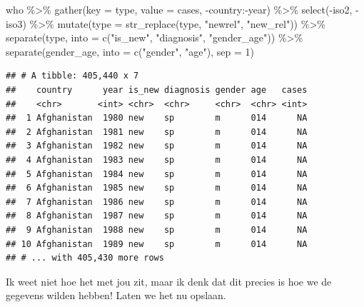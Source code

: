 \documentclass[]{tufte-book}
\newenvironment{Shaded}{}{}
\newcommand{\AttributeTok}[1]{\textcolor[rgb]{0.49,0.56,0.16}{#1}}
\newcommand{\DecValTok}[1]{\textcolor[rgb]{0.25,0.63,0.44}{#1}}
\newcommand{\FunctionTok}[1]{\textcolor[rgb]{0.02,0.16,0.49}{#1}}
\newcommand{\NormalTok}[1]{#1}
\newcommand{\SpecialCharTok}[1]{\textcolor[rgb]{0.25,0.44,0.63}{#1}}
\newcommand{\StringTok}[1]{\textcolor[rgb]{0.25,0.44,0.63}{#1}}
\begin{document}
\begin{Shaded}
\begin{Highlighting}[]
\NormalTok{who }\SpecialCharTok{\%\textgreater{}\%}
  \FunctionTok{gather}\NormalTok{(}\AttributeTok{key =}\NormalTok{ type, }\AttributeTok{value =}\NormalTok{ cases, }\SpecialCharTok{{-}}\NormalTok{country}\SpecialCharTok{:{-}}\NormalTok{year) }\SpecialCharTok{\%\textgreater{}\%}
  \FunctionTok{select}\NormalTok{(}\SpecialCharTok{{-}}\NormalTok{iso2, }\SpecialCharTok{{-}}\NormalTok{iso3) }\SpecialCharTok{\%\textgreater{}\%}
  \FunctionTok{mutate}\NormalTok{(}\AttributeTok{type =} \FunctionTok{str\_replace}\NormalTok{(type, }\StringTok{"newrel"}\NormalTok{, }\StringTok{"new\_rel"}\NormalTok{)) }\SpecialCharTok{\%\textgreater{}\%}
  \FunctionTok{separate}\NormalTok{(type, }\AttributeTok{into =} \FunctionTok{c}\NormalTok{(}\StringTok{"is\_new"}\NormalTok{, }\StringTok{"diagnosis"}\NormalTok{, }\StringTok{"gender\_age"}\NormalTok{)) }\SpecialCharTok{\%\textgreater{}\%}
  \FunctionTok{separate}\NormalTok{(gender\_age, }\AttributeTok{into =} \FunctionTok{c}\NormalTok{(}\StringTok{"gender"}\NormalTok{, }\StringTok{"age"}\NormalTok{), }\AttributeTok{sep =} \DecValTok{1}\NormalTok{)}
\end{Highlighting}
\end{Shaded}

\begin{verbatim}
## # A tibble: 405,440 x 7
##    country      year is_new diagnosis gender age   cases
##    <chr>       <int> <chr>  <chr>     <chr>  <chr> <int>
##  1 Afghanistan  1980 new    sp        m      014      NA
##  2 Afghanistan  1981 new    sp        m      014      NA
##  3 Afghanistan  1982 new    sp        m      014      NA
##  4 Afghanistan  1983 new    sp        m      014      NA
##  5 Afghanistan  1984 new    sp        m      014      NA
##  6 Afghanistan  1985 new    sp        m      014      NA
##  7 Afghanistan  1986 new    sp        m      014      NA
##  8 Afghanistan  1987 new    sp        m      014      NA
##  9 Afghanistan  1988 new    sp        m      014      NA
## 10 Afghanistan  1989 new    sp        m      014      NA
## # ... with 405,430 more rows
\end{verbatim}

Ik weet niet hoe het met jou zit, maar ik denk dat dit precies is hoe we de gegevens wilden hebben! Laten we het nu opslaan.
\end{document}
